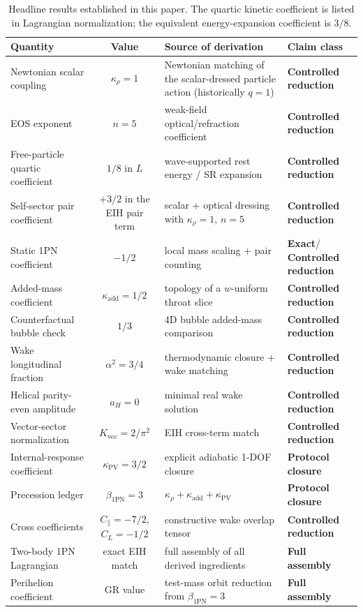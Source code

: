 \documentclass[11pt]{article}
\newcommand{\kadd}{\kappa_{\mathrm{add}}}
\newcommand{\kPV}{\kappa_{\mathrm{PV}}}
\newcommand{\krho}{\kappa_{\rho}}
\newcommand{\betaPN}{\beta_{\mathrm{1PN}}}
\newcommand{\Kvec}{K_{\mathrm{vec}}}
\newcommand{\alphaSq}{\alpha^2}
\newcommand{\Cpara}{C_{\parallel}}
\newcommand{\CLong}{C_{L}}
\newcommand{\Exact}{\textbf{Exact}}
\newcommand{\Controlled}{\textbf{Controlled reduction}}
\newcommand{\Protocol}{\textbf{Protocol closure}}
\newcommand{\FullMatch}{\textbf{Full assembly}}
\begin{document}
\begin{table}[t]
  \centering
  \caption{Headline results established in this paper. The quartic kinetic coefficient is listed in Lagrangian normalization; the equivalent energy-expansion coefficient is \(3/8\).}
  \label{tab:headline-results}
  \small
  \setlength{\tabcolsep}{4pt}
  \renewcommand{\arraystretch}{1.18}
  \begin{tabularx}{\linewidth}{@{}L c L L@{}}
    \toprule
    Quantity & Value & Source of derivation & Claim class \\
    \midrule
    Newtonian scalar coupling & \(\krho=1\) & Newtonian matching of the scalar-dressed particle action (historically \(q=1\)) & \Controlled \\
    EOS exponent & \(n=5\) & weak-field optical/refraction coefficient & \Controlled \\
    Free-particle quartic coefficient & \(1/8\) in \(L\) & wave-supported rest energy / SR expansion & \Controlled \\
    Self-sector pair coefficient & \(+3/2\) in the EIH pair term & scalar + optical dressing with \(\krho=1\), \(n=5\) & \Controlled \\
    Static 1PN coefficient & \(-1/2\) & local mass scaling + pair counting & \Exact / \Controlled \\
    Added-mass coefficient & \(\kadd=1/2\) & topology of a \(w\)-uniform throat slice & \Controlled \\
    Counterfactual bubble check & \(1/3\) & 4D bubble added-mass comparison & \Controlled \\
    Wake longitudinal fraction & \(\alphaSq=3/4\) & thermodynamic closure + wake matching & \Controlled \\
    Helical parity-even amplitude & \(a_H=0\) & minimal real wake solution & \Controlled \\
    Vector-sector normalization & \(\Kvec=2/\pi^2\) & EIH cross-term match & \Controlled \\
    Internal-response coefficient & \(\kPV=3/2\) & explicit adiabatic 1-DOF closure & \Protocol \\
    Precession ledger & \(\betaPN=3\) & \(\krho+\kadd+\kPV\) & \Protocol \\
    Cross coefficients & \(\Cpara=-7/2\), \(\CLong=-1/2\) & constructive wake overlap tensor & \Controlled \\
    Two-body 1PN Lagrangian & exact EIH match & full assembly of all derived ingredients & \FullMatch \\
    Perihelion coefficient & GR value & test-mass orbit reduction from \(\betaPN=3\) & \FullMatch \\
    \bottomrule
  \end{tabularx}
\end{table}
\end{document}
